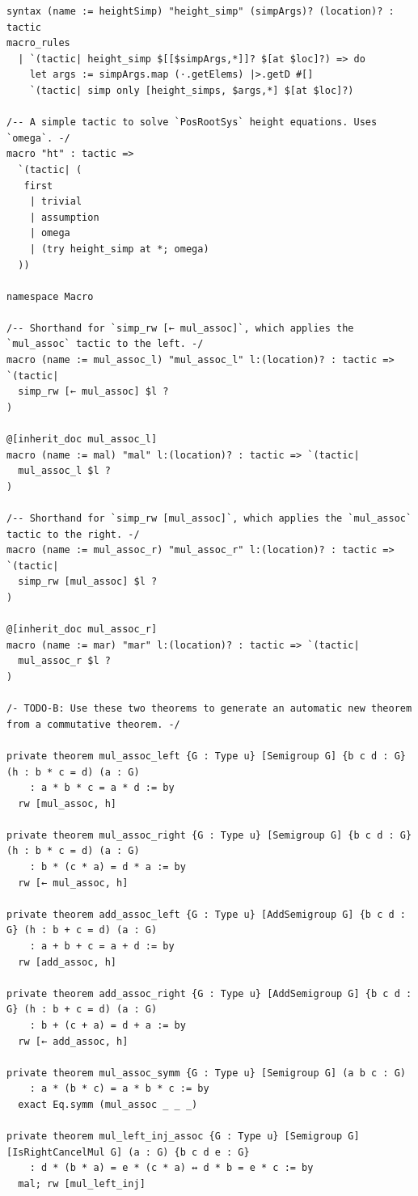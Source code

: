 \documentclass[10pt,a4paper]{article}
\begin{document}
\begin{Verbatim}
syntax (name := heightSimp) "height_simp" (simpArgs)? (location)? : tactic
macro_rules
  | `(tactic| height_simp $[[$simpArgs,*]]? $[at $loc]?) => do
    let args := simpArgs.map (·.getElems) |>.getD #[]
    `(tactic| simp only [height_simps, $args,*] $[at $loc]?)

/-- A simple tactic to solve `PosRootSys` height equations. Uses `omega`. -/
macro "ht" : tactic =>
  `(tactic| (
   first
    | trivial
    | assumption
    | omega
    | (try height_simp at *; omega)
  ))

namespace Macro

/-- Shorthand for `simp_rw [← mul_assoc]`, which applies the `mul_assoc` tactic to the left. -/
macro (name := mul_assoc_l) "mul_assoc_l" l:(location)? : tactic => `(tactic|
  simp_rw [← mul_assoc] $l ?
)

@[inherit_doc mul_assoc_l]
macro (name := mal) "mal" l:(location)? : tactic => `(tactic|
  mul_assoc_l $l ?
)

/-- Shorthand for `simp_rw [mul_assoc]`, which applies the `mul_assoc` tactic to the right. -/
macro (name := mul_assoc_r) "mul_assoc_r" l:(location)? : tactic => `(tactic|
  simp_rw [mul_assoc] $l ?
)

@[inherit_doc mul_assoc_r]
macro (name := mar) "mar" l:(location)? : tactic => `(tactic|
  mul_assoc_r $l ?
)

/- TODO-B: Use these two theorems to generate an automatic new theorem from a commutative theorem. -/

private theorem mul_assoc_left {G : Type u} [Semigroup G] {b c d : G} (h : b * c = d) (a : G)
    : a * b * c = a * d := by
  rw [mul_assoc, h]

private theorem mul_assoc_right {G : Type u} [Semigroup G] {b c d : G} (h : b * c = d) (a : G)
    : b * (c * a) = d * a := by
  rw [← mul_assoc, h]

private theorem add_assoc_left {G : Type u} [AddSemigroup G] {b c d : G} (h : b + c = d) (a : G)
    : a + b + c = a + d := by
  rw [add_assoc, h]

private theorem add_assoc_right {G : Type u} [AddSemigroup G] {b c d : G} (h : b + c = d) (a : G)
    : b + (c + a) = d + a := by
  rw [← add_assoc, h]

private theorem mul_assoc_symm {G : Type u} [Semigroup G] (a b c : G)
    : a * (b * c) = a * b * c := by
  exact Eq.symm (mul_assoc _ _ _)

private theorem mul_left_inj_assoc {G : Type u} [Semigroup G] [IsRightCancelMul G] (a : G) {b c d e : G}
    : d * (b * a) = e * (c * a) ↔ d * b = e * c := by
  mal; rw [mul_left_inj]


\end{Verbatim}
\end{document}
